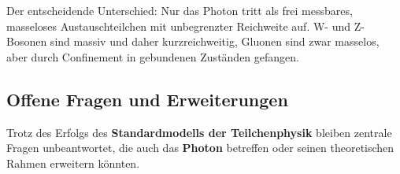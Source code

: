 Der entscheidende Unterschied:  
Nur das Photon tritt als frei messbares, masseloses Austauschteilchen mit unbegrenzter Reichweite auf.  
W- und Z-Bosonen sind massiv und daher kurzreichweitig, Gluonen sind zwar masselos, aber durch Confinement in gebundenen Zuständen gefangen.
\vspace{1em}
\begin{tcolorbox}[hinweisbox, title=Vergleich der Eichbosonen]
	\label{box:eichbosonen_vergleich}
	\small
	
	
\end{tcolorbox}




\subsection{Offene Fragen und Erweiterungen}

Trotz des Erfolgs des \textbf{Standardmodells der Teilchenphysik} bleiben zentrale Fragen unbeantwortet, die auch das \textbf{Photon} betreffen oder seinen theoretischen Rahmen erweitern könnten.


